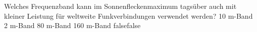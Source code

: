     {Welches Frequenzband kann im Sonnenfleckenmaximum tagsüber auch mit kleiner Leistung für weltweite Funkverbindungen verwendet werden?}
    {10 m-Band}
    {2 m-Band}
    {80 m-Band}
    {160 m-Band}
    {false}{false}